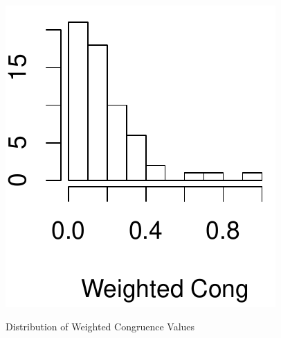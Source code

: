 \documentclass[12pt,oneside]{book}
\begin{document}
\begin{figure}[t]
{	\includegraphics[scale=0.372]{figures/hist_weighted_err}
     \label{subfig:hist_weighted_err}
  }
	\caption{Distribution of Weighted Congruence Values}
	\label{fig:hist_weighted_congruence}
\end{figure}



\end{document}
